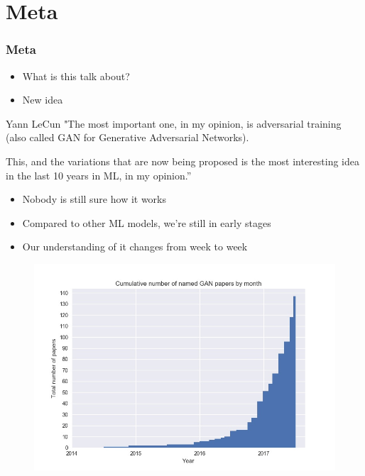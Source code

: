 \documentclass{Bredelebeamer}
\begin{document}
\section{Meta} %

\begin{frame} \frametitle{Meta}
\begin{itemize}[<+->]
	\item What is this talk about?
	\item New idea
\end{itemize}

\pause[3]
\begin{block}{Yann LeCun}
"The most important one, in my opinion, is adversarial training (also called GAN for Generative Adversarial Networks).

This, and the variations that are now being proposed is the most interesting idea in the last 10 years in ML, in my opinion.”
\end{block}

\begin{itemize}[<+(1)->]
	\item Nobody is still sure how it works
	\item Compared to other ML models, we're still in early stages
	\item Our understanding of it changes from week to week
\end{itemize}
\end{frame}


\begin{frame}
\begin{figure}[h!]
	\centering
	\includegraphics[width=\textwidth]{gan_timeline.jpg}
\end{figure}

\end{frame}
\end{document}
